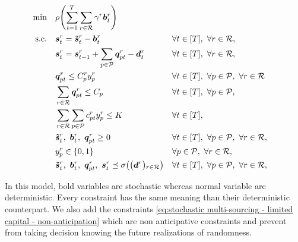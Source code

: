 \begin{subequations}\label{eq:stochastic multi-sourcing - limited capital}
  \begin{align}
    \min\quad & \rlap{$\ds \rho\bracket{\sum_{t=1}^{\horizon} \sum_{r\in\REF} \backorder^r \va\backlog_t^r}$}
    \label{eq:stochastic multi-sourcing - limited capital - objective}
    \\
    \st\quad & \ds \va\inventory_t^r = \va\excess_t^r - \va\backlog_t^r && \forall t\in\range{\horizon},\ \forall r\in\REF,
    \label{eq:stochastic multi-sourcing - limited capital - inventory}
    \\
    & \ds \va\inventory_t^r = \va\inventory_{t-1}^r + \sum_{p\in\plants}\va\quantity_{pt}^r - \va\demand_t^r && \forall t\in\range{\horizon},\ \forall r\in\REF,
    \label{eq:stochastic multi-sourcing - limited capital - dynamic}
    \\
    & \ds \va\quantity_{pt}^r \le \capacity_p^r \assign_p^r && \forall t\in\range{\horizon},\ \forall p\in\plants,\ \forall r\in\REF
    \label{eq:stochastic multi-sourcing - limited capital - big M}
    \\
    & \ds \sum_{r\in\REF}\va\quantity_{pt}^r \le \capacity_p && \forall t\in\range{\horizon},\ \forall p\in\plants,
    \label{eq:stochastic multi-sourcing - limited capital - capacity}
    \\
    & \ds \sum_{r\in\REF} \sum_{p\in\plants}\affect_{pt}^r\assign_p^r \le \capital && \forall t\in\range{\horizon},
    \label{eq:stochastic multi-sourcing - limited capital - capital}
    \\
    & \ds \va\excess_t^r,\ \va\backlog_t^r,\ \va\quantity_{pt}^r \ge 0 && \forall t\in\range{\horizon},\ \forall p\in\plants,\ \forall r\in\REF,
    \label{eq:stochastic multi-sourcing - limited capital - nonnegativity}
    \\
    & \ds \assign_p^r \in \crbracket{0,1} && \forall p\in\plants,\ \forall r\in\REF,
    \label{eq:stochastic multi-sourcing - limited capital - binary}
    \\
    & \ds \va\excess_t^r,\ \va\backlog_t^r,\ \va\quantity_{pt}^r,\ \va\inventory_t^r \preceq \Sfield{\bracket{\va\demand^r}_{r\in\REF}} && \forall t\in\range{\horizon},\ \forall p\in\plants,\ \forall r\in\REF,
    \label{eq:stochastic multi-sourcing - limited capital - non-anticipation}
  \end{align}
\end{subequations}

In this model, bold variables are stochastic whereas normal variable are deterministic. Every constraint has the same meaning than their deterministic counterpart. We also add the constraints \eqref{eq:stochastic multi-sourcing - limited capital - non-anticipation} which are non anticipative constraints and prevent from taking decision knowing the future realizations of randomness.


